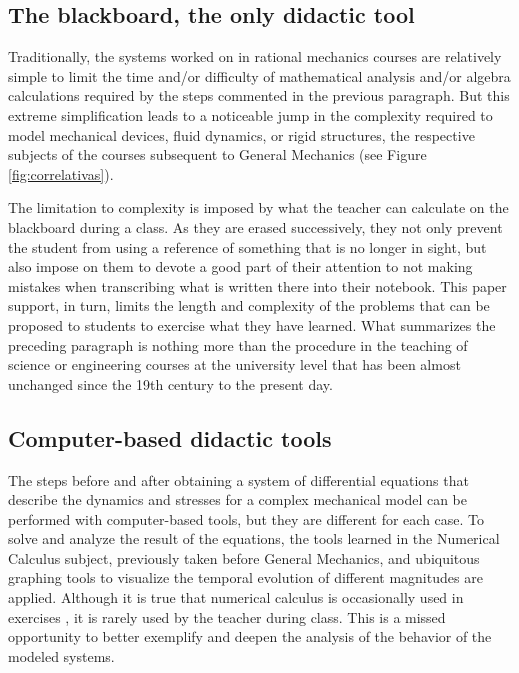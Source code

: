 \subsection{The blackboard, the only didactic tool}

Traditionally, the systems worked on in rational mechanics courses are relatively simple to limit the time and/or difficulty of mathematical analysis and/or algebra calculations required by the steps commented in the previous paragraph. But this extreme simplification leads to a noticeable jump in the complexity required to model mechanical devices, fluid dynamics, or rigid structures, the respective subjects of the courses subsequent to General Mechanics (see Figure \ref{fig:correlativas}).

The limitation to complexity is imposed by what the teacher can calculate on the blackboard during a class. As they are erased successively, they not only prevent the student from using a reference of something that is no longer in sight, but also impose on them to devote a good part of their attention to not making mistakes when transcribing what is written there into their notebook. This paper support, in turn, limits the length and complexity of the problems that can be proposed to students to exercise what they have learned. What summarizes the preceding paragraph is nothing more than the procedure in the teaching of science or engineering courses at the university level that has been almost unchanged since the 19th century to the present day.


\subsection{Computer-based didactic tools}

The steps before and after obtaining a system of differential equations that describe the dynamics and stresses for a complex mechanical model can be performed with computer-based tools, but they are different for each case. To solve and analyze the result of the equations, the tools learned in the Numerical Calculus subject, previously taken before General Mechanics, and ubiquitous graphing tools to visualize the temporal evolution of different magnitudes are applied. Although it is true that numerical calculus is occasionally used in exercises \cite{mirasso-raichman, caligaris-rodriguez}, it is rarely used by the teacher during class. This is a missed opportunity to better exemplify and deepen the analysis of the behavior of the modeled systems.

